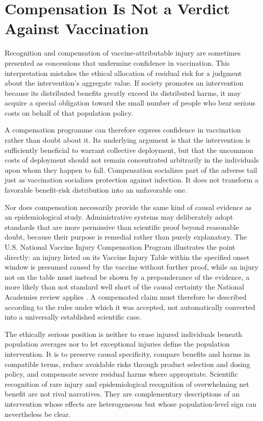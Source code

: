 \documentclass[11pt]{article}
\begin{document}
\section{Compensation Is Not a Verdict Against Vaccination}

Recognition and compensation of vaccine-attributable injury are sometimes presented as concessions that undermine confidence in vaccination. This interpretation mistakes the ethical allocation of residual risk for a judgment about the intervention's aggregate value. If society promotes an intervention because its distributed benefits greatly exceed its distributed harms, it may acquire a special obligation toward the small number of people who bear serious costs on behalf of that population policy.

A compensation programme can therefore express confidence in vaccination rather than doubt about it. Its underlying argument is that the intervention is sufficiently beneficial to warrant collective deployment, but that the uncommon costs of deployment should not remain concentrated arbitrarily in the individuals upon whom they happen to fall. Compensation socializes part of the adverse tail just as vaccination socializes protection against infection. It does not transform a favorable benefit-risk distribution into an unfavorable one.

Nor does compensation necessarily provide the same kind of causal evidence as an epidemiological study. Administrative systems may deliberately adopt standards that are more permissive than scientific proof beyond reasonable doubt, because their purpose is remedial rather than purely explanatory. The U.S. National Vaccine Injury Compensation Program illustrates the point directly: an injury listed on its Vaccine Injury Table within the specified onset window is presumed caused by the vaccine without further proof, while an injury not on the table must instead be shown by a preponderance of the evidence, a more likely than not standard well short of the causal certainty the National Academies review applies \citep{nvicp2024,nasem2024}. A compensated claim must therefore be described according to the rules under which it was accepted, not automatically converted into a universally established scientific case.

The ethically serious position is neither to erase injured individuals beneath population averages nor to let exceptional injuries define the population intervention. It is to preserve causal specificity, compare benefits and harms in compatible terms, reduce avoidable risks through product selection and dosing policy, and compensate severe residual harms where appropriate. Scientific recognition of rare injury and epidemiological recognition of overwhelming net benefit are not rival narratives. They are complementary descriptions of an intervention whose effects are heterogeneous but whose population-level sign can nevertheless be clear.
\end{document}
